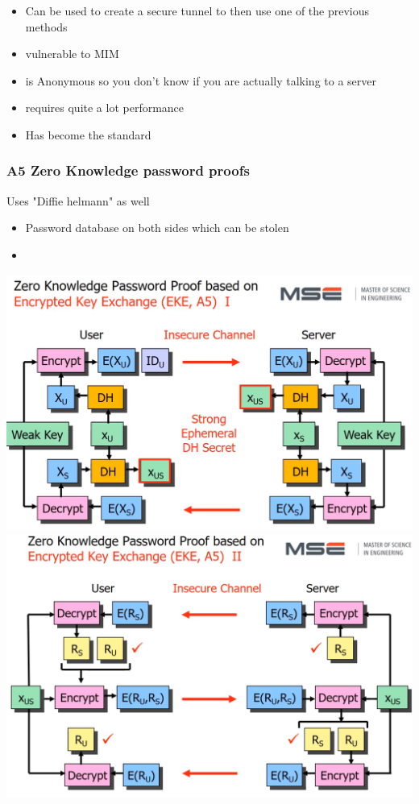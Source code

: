 \documentclass[12pt]{article}
\begin{document}
\begin{itemize}
    \item Can be used to create a secure tunnel to then use one of the previous methods
    \item vulnerable to MIM
    \item is Anonymous so you don't know if you are actually talking to a server
    \item requires quite a lot performance
    \item Has become the standard
\end{itemize}

\subsubsection*{A5 Zero Knowledge password proofs}
Uses "Diffie helmann" as well

\begin{itemize}
    \item Password database on both sides which can be stolen
    \item 
\end{itemize}

\includegraphics[width=\textwidth]{ZeroKnowledgePasswordProof.png}
\includegraphics[width=\textwidth]{ZeroKnowledgePasswordProof2.png}
\end{document}
